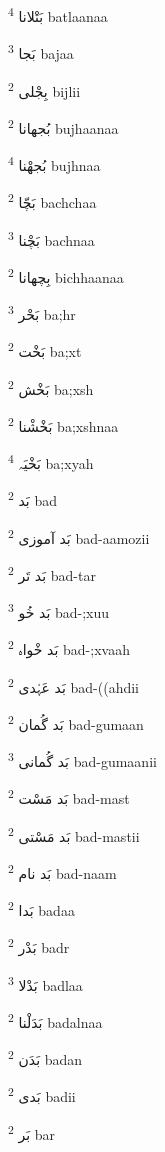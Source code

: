 \documentclass[12pt]{article}
\begin{document}
\begin{multicols}{5}
{\ur بَتْلانا}   \textsuperscript{4} batlaanaa

{\ur بَجا}   \textsuperscript{3} bajaa

{\ur بِجْلی}   \textsuperscript{2} bijlii

{\ur بُجھانا}   \textsuperscript{2} bujhaanaa

{\ur بُجھْنا}   \textsuperscript{4} bujhnaa

{\ur بَچّا}   \textsuperscript{2} bachchaa

{\ur بَچْنا}   \textsuperscript{3} bachnaa

{\ur بِچھانا}   \textsuperscript{2} bichhaanaa

{\ur بَحْر}   \textsuperscript{3} ba;hr

{\ur بَخْت}   \textsuperscript{2} ba;xt

{\ur بَخْش}   \textsuperscript{2} ba;xsh

{\ur بَخْشْنا}   \textsuperscript{2} ba;xshnaa

{\ur بَخْیَہ}   \textsuperscript{4} ba;xyah

{\ur بَد}   \textsuperscript{2} bad

{\ur بَد آموزی}   \textsuperscript{2} bad-aamozii

{\ur بَد تَر}   \textsuperscript{2} bad-tar

{\ur بَد خُو}   \textsuperscript{3} bad-;xuu

{\ur بَد خْواہ}   \textsuperscript{2} bad-;xvaah

{\ur بَد عَہْدی}   \textsuperscript{2} bad-((ahdii

{\ur بَد گُمان}   \textsuperscript{2} bad-gumaan

{\ur بَد گُمانی}   \textsuperscript{3} bad-gumaanii

{\ur بَد مَسْت}   \textsuperscript{2} bad-mast

{\ur بَد مَسْتی}   \textsuperscript{2} bad-mastii

{\ur بَد نام}   \textsuperscript{2} bad-naam

{\ur بَدا}   \textsuperscript{2} badaa

{\ur بَدْر}   \textsuperscript{2} badr

{\ur بَدْلا}   \textsuperscript{3} badlaa

{\ur بَدَلْنا}   \textsuperscript{2} badalnaa

{\ur بَدَن}   \textsuperscript{2} badan

{\ur بَدی}   \textsuperscript{2} badii

{\ur بَر}   \textsuperscript{2} bar


\end{multicols}
\end{document}
